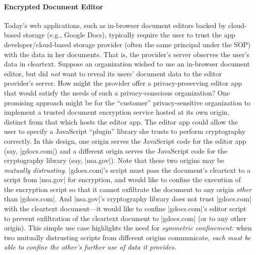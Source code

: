 \paragraph{Encrypted Document Editor}
Today's web applications, such as in-browser document editors backed
by cloud-based storage (e.g., Google Docs), typically require the user
to trust the app developer/cloud-based storage provider (often the
same principal under the SOP) with the data in her documents. That is,
the provider's server observes the user's data in cleartext. Suppose
an organization wished to use an in-browser document editor, but did
{\em not} want to reveal its users' document data to the editor
provider's server. How might the provider offer a privacy-preserving
editor app that would satisfy the needs of such a privacy-conscious
organization?  One promising approach might be for the ``customer''
privacy-sensitive organization to implement a trusted document encryption
service hosted at its own origin, distinct from that which hosts the
editor app. The editor app could allow the user to specify a JavaScript
``plugin'' library she trusts to perform cryptography correctly. In this design,
one origin serves the JavaScript code for the editor app (say,
\js|gdocs.com|) and a different origin serves the JavaScript code for
the cryptography library (say, \js|nsa.gov|). Note that these two
origins may be {\em mutually distrusting.}  \js|gdocs.com|'s script
must pass the document's cleartext to a script from \js|nsa.gov| for
encryption, and would like to confine the execution of the encryption
script so that it cannot exfiltrate the document to any origin {\em
other} than \js|gdocs.com|. And \js|nsa.gov|'s cryptography library
does not trust \js|gdocs.com| with the cleartext document---it would
like to confine \js|gdocs.com|'s editor script to prevent
exfiltration of the cleartext document to \js|gdocs.com| (or to any
other origin). This simple use case highlights the need for {\em
  symmetric confinement:} when two mutually distrusting scripts from
different origins communicate, {\em each must be able to confine the
  other's further use of data it provides.}


